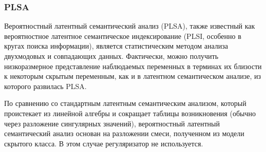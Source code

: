 \documentclass{article}
\begin{document}
\subsubsection{PLSA}
Вероятностный латентный семантический анализ (PLSA), также известный как вероятностное латентное семантическое индексирование (PLSI, особенно в кругах поиска информации), является статистическим методом анализа двухмодовых и совпадающих данных. Фактически, можно получить низкоразмерное представление наблюдаемых переменных в терминах их близости к некоторым скрытым переменным, как и в латентном семантическом анализе, из которого развилась PLSA.

По сравнению со стандартным латентным семантическим анализом, который проистекает из линейной алгебры и сокращает таблицы возникновения (обычно через разложение сингулярных значений), вероятностный латентный семантический анализ основан на разложении смеси, полученном из модели скрытого класса.
В этом случае регуляризатор не используется.
\maketitle


\end{document}
